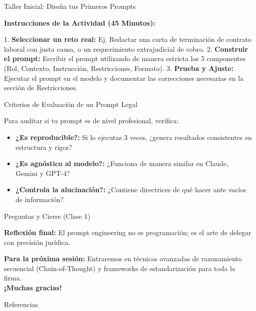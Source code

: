 \documentclass[aspectratio=169]{beamer}
\begin{document}
\begin{frame}[fragile]{Taller Inicial: Diseña tus Primeros Prompts}


\textbf{Instrucciones de la Actividad (45 Minutos):}

1. \textbf{Seleccionar un reto real:} Ej. Redactar una carta de terminación de contrato laboral con justa causa, o un requerimiento extrajudicial de cobro.
2. \textbf{Construir el prompt:} Escribir el prompt utilizando de manera estricta los 5 componentes (Rol, Contexto, Instrucción, Restricciones, Formato).
3. \textbf{Prueba y Ajuste:} Ejecutar el prompt en el modelo y documentar las correcciones necesarias en la sección de Restricciones.


\end{frame}



\begin{frame}[fragile]{Criterios de Evaluación de un Prompt Legal}


Para auditar si tu prompt es de nivel profesional, verifica:

\begin{itemize}
  \item \textbf{¿Es reproducible?:} Si lo ejecutas 3 veces, ¿genera resultados consistentes en estructura y rigor?
  \item \textbf{¿Es agnóstico al modelo?:} ¿Funciona de manera similar en Claude, Gemini y GPT-4?
  \item \textbf{¿Controla la alucinación?:} ¿Contiene directrices de qué hacer ante vacíos de información?
\end{itemize}
\end{frame}



\begin{frame}[fragile]{Preguntas y Cierre (Clase 1)}


\textbf{Reflexión final:} El prompt engineering no es programación; es el arte de delegar con precisión jurídica.

\textbf{Para la próxima sesión:} Entraremos en técnicas avanzadas de razonamiento secuencial (Chain-of-Thought) y frameworks de estandarización para toda la firma.\\


\textbf{¡Muchas gracias!}

\end{frame}




\begin{frame}[allowframebreaks]{Referencias}
  
  
\end{frame}
\end{document}
